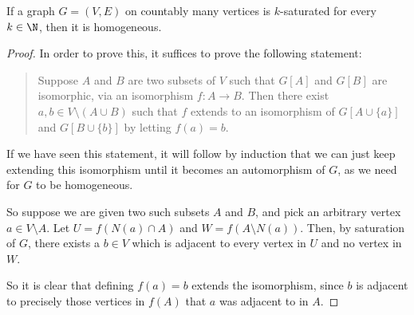 \documentclass[nobib]{tufte-handout}
\begin{document}
\begin{lemma}
    If a graph $G = (V,E)$ on countably many vertices is $k$-saturated for every $k \in \N$, then it is homogeneous.
    
    \begin{proof}
        In order to prove this, it suffices to prove the following statement:
        \begin{quotation}
            Suppose $A$ and $B$ are two subsets of $V$ such that $G[A]$ and $G[B]$ are isomorphic, via an isomorphism $f: A \to B$. Then there exist $a, b \in V\setminus (A \cup B)$ such that $f$ extends to an isomorphism of $G[A \cup \{a\}]$ and $G[B \cup \{b\}]$ by letting $f(a) = b$.
        \end{quotation}

        If we have seen this statement, it will follow by induction that we can just keep extending this isomorphism until it becomes an automorphism of $G$, as we need for $G$ to be homogeneous.

        So suppose we are given two such subsets $A$ and $B$, and pick an arbitrary vertex $a \in V \setminus A$. Let $U = f\left(N(a) \cap A\right)$ and $W = f\left(A \setminus N(a)\right)$. Then, by saturation of $G$, there exists a $b \in V$ which is adjacent to every vertex in $U$ and no vertex in $W$.

        So it is clear that defining $f(a) = b$ extends the isomorphism, since $b$ is adjacent to precisely those vertices in $f(A)$ that $a$ was adjacent to in $A$.
    \end{proof}
\end{lemma}
\end{document}

